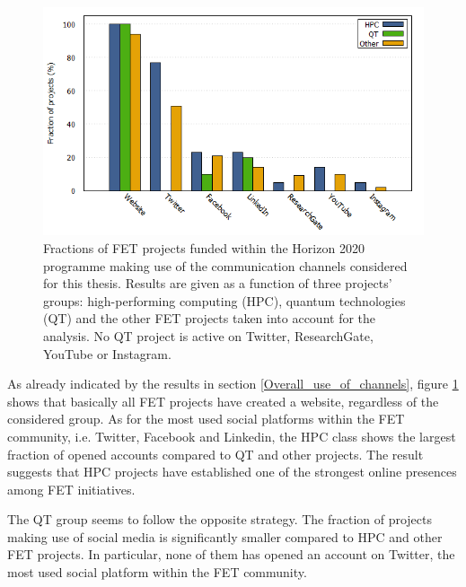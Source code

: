 \begin{figure}[!t] 
 \begin{center}
 \includegraphics[scale=0.47]{Images/Social_media_breakdown.png}
 \caption{Fractions of FET projects funded within the Horizon 2020 programme making use of the communication channels considered for this thesis. Results are given as a function of three projects' groups: high-performing computing (HPC), quantum technologies (QT) and the other FET projects taken into account for the analysis. No QT project is active on Twitter, ResearchGate, YouTube or Instagram.}
 \label{Social_media_breakdown}
 \end{center}
\end{figure}

As already indicated by the results in section \ref{Overall_use_of_channels}, figure \ref{Social_media_breakdown} shows that basically all FET projects have created a website, regardless of the considered group. As for the most used social platforms within the FET community, i.e. Twitter, Facebook and Linkedin, the HPC class shows the largest fraction of opened accounts compared to QT and other projects. The result suggests that HPC projects have established one of the strongest online presences among FET initiatives.  

The QT group seems to follow the opposite strategy. The fraction of projects making use of social media is significantly smaller compared to HPC and other FET projects. In particular, none of them has opened an account on Twitter, the most used social platform within the FET community. 

